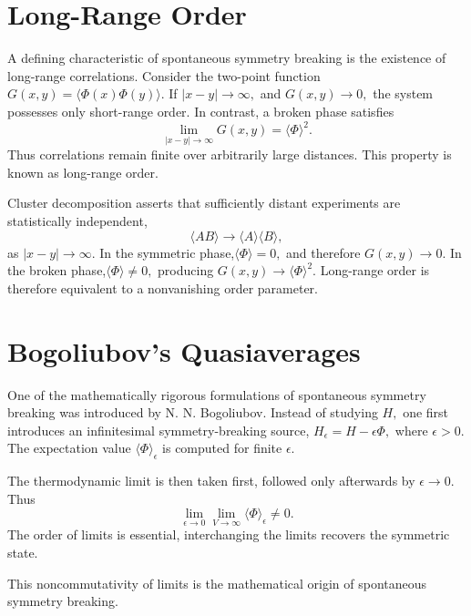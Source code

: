 \section{Long-Range Order}
A defining characteristic of spontaneous symmetry breaking is the
existence of long-range correlations.
Consider the two-point function $G(x,y)=\langle\Phi(x)\Phi(y)\rangle .$
If $|x-y| \rightarrow \infty,$ and $G(x,y) \rightarrow 0,$
the system possesses only short-range order.
In contrast,
a broken phase satisfies
\[\boxed{\lim_{|x-y|\rightarrow\infty} G(x,y)=\langle\Phi\rangle^2.}\]
Thus correlations remain finite over arbitrarily large distances.
This property is known as long-range order.

Cluster decomposition asserts that sufficiently distant experiments are
statistically independent,
\[\langle AB \rangle \rightarrow \langle A\rangle \langle B\rangle,\]
as $|x-y| \rightarrow \infty.$
In the symmetric phase,$\langle\Phi\rangle=0,$ and therefore
$G(x,y) \rightarrow 0.$ In the broken phase,$\langle\Phi\rangle\neq 0,$
producing $G(x,y) \rightarrow \langle\Phi\rangle^2.$
Long-range order is therefore equivalent to a nonvanishing order
parameter.

\section{Bogoliubov's Quasiaverages}
One of the mathematically rigorous formulations of spontaneous symmetry
breaking was introduced by N. N. Bogoliubov.
Instead of studying $ H,$ one first introduces an infinitesimal symmetry-breaking source, $H_\epsilon=H-\epsilon\Phi,$ where $\epsilon>0.$
The expectation value $\langle\Phi\rangle_\epsilon $ 
is computed for finite $\epsilon.$

The thermodynamic limit is then taken first,
followed only afterwards by $\epsilon\rightarrow 0.$
Thus
\[\boxed{\lim_{\epsilon\to0}\lim_{V\to\infty}
\langle\Phi\rangle_\epsilon \neq 0.}\]
The order of limits is essential, interchanging the limits 
recovers the symmetric state.

This noncommutativity of limits is the mathematical origin of
spontaneous symmetry breaking.

